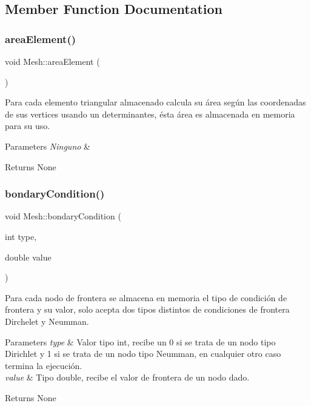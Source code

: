 \subsection{Member Function Documentation}
\hypertarget{class_mesh_a71e8935f4fb4b98e12aefb137ab15131}{}\label{class_mesh_a71e8935f4fb4b98e12aefb137ab15131} 
\subsubsection{\texorpdfstring{area\+Element()}{areaElement()}}
{\footnotesize\ttfamily void Mesh\+::area\+Element (\begin{DoxyParamCaption}{ }\end{DoxyParamCaption})}



Para cada elemento triangular almacenado calcula su área según las coordenadas de sus vertices usando un determinantes, ésta área es almacenada en memoria para su uso. 


\begin{DoxyParams}{Parameters}
{\em Ninguno} & \\
\hline
\end{DoxyParams}
\begin{DoxyReturn}{Returns}
None 
\end{DoxyReturn}
\hypertarget{class_mesh_abe2ade2afc588a69ae7793eac37babfe}{}\label{class_mesh_abe2ade2afc588a69ae7793eac37babfe} 
\subsubsection{\texorpdfstring{bondary\+Condition()}{bondaryCondition()}}
{\footnotesize\ttfamily void Mesh\+::bondary\+Condition (\begin{DoxyParamCaption}\item[{int}]{type,  }\item[{double}]{value }\end{DoxyParamCaption})}



Para cada nodo de frontera se almacena en memoria el tipo de condición de frontera y su valor, solo acepta dos tipos distintos de condiciones de frontera Dirchelet y Neumman. 


\begin{DoxyParams}{Parameters}
{\em type} & Valor tipo int, recibe un 0 si se trata de un nodo tipo Dirichlet y 1 si se trata de un nodo tipo Neumman, en cualquier otro caso termina la ejecución. \\
\hline
{\em value} & Tipo double, recibe el valor de frontera de un nodo dado. \\
\hline
\end{DoxyParams}
\begin{DoxyReturn}{Returns}
None 
\end{DoxyReturn}
\hypertarget{class_mesh_a7860c41775b643917ea5e8d763ba0505}{}\label{class_mesh_a7860c41775b643917ea5e8d763ba0505} 
